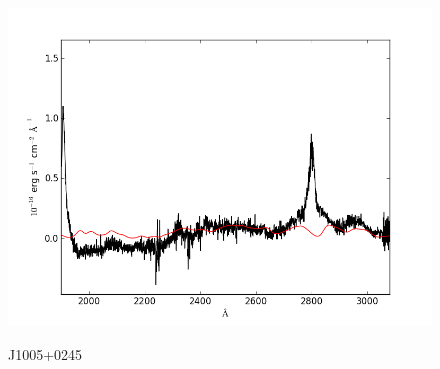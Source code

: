 \documentclass[usenatbib]{mn2e}
\begin{document}
\begin{figure}
\begin{center}
\vspace{5mm}
\includegraphics[width=0.49\linewidth,angle=0]{./red/fe_fit_SBB_7.png}\\

\end{center} 
\caption{J1005+0245 \label{fig:landscape}}   
\end{figure}

\newpage
\end{document}

